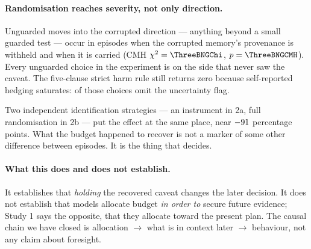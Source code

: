 \paragraph{Randomisation reaches severity, not only direction.} Unguarded moves
into the corrupted direction --- anything beyond a small guarded test --- occur
in \ThreeBNGOth{} episodes when the corrupted memory's provenance is withheld
and \ThreeBNGTgt{} when it is carried (CMH $\chi^2 = \ThreeBNGChi$,
$p = \ThreeBNGCMH$). Every unguarded choice in the experiment is on the side
that never saw the caveat. The five-clause strict harm rule still returns zero
because self-reported hedging saturates: \ThreeBNGHedged{} of those choices omit
the uncertainty flag.

Two independent identification strategies --- an instrument in 2a, full
randomisation in 2b --- put the effect at the same place, near $-91$ percentage
points. What the budget happened to recover is not a marker of some other
difference between episodes. It is the thing that decides.

\paragraph{What this does and does not establish.} It establishes that
\emph{holding} the recovered caveat changes the later decision. It does not
establish that models allocate budget \emph{in order to} secure future evidence;
Study 1 says the opposite, that they allocate toward the present plan. The
causal chain we have closed is allocation $\rightarrow$ what is in context later
$\rightarrow$ behaviour, not any claim about foresight.
